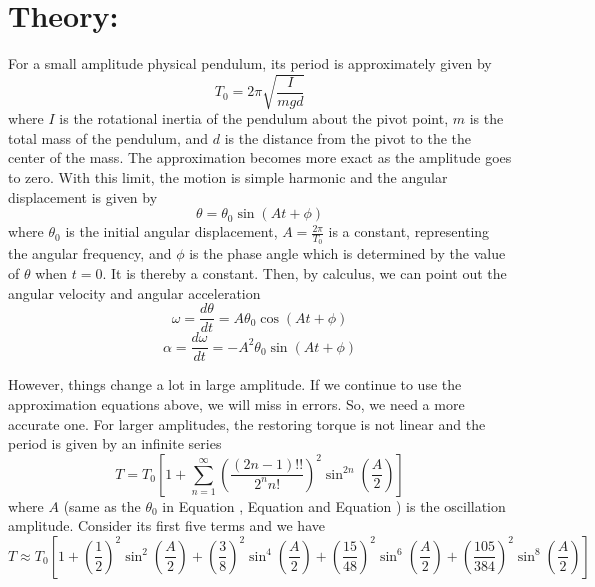 \section{Theory:}
For a small amplitude physical pendulum, its period is approximately given by
\begin{equation}\label{eq:1}
  T_0=2\pi\sqrt{\frac{I}{mgd}}
\end{equation}
where $I$ is the rotational inertia of the pendulum about the pivot point, $m$ is the total mass of the pendulum, and $d$ is the distance from the pivot to the the center of the mass. The approximation becomes more exact as the amplitude goes to zero. With this limit, the motion is simple harmonic and the angular displacement is given by
\begin{equation}\label{eq:2}
  \theta=\theta_0\sin(At+\phi)
\end{equation}
where $\theta_0$ is the initial angular displacement, $A=\frac{2\pi}{T_0}$ is a constant, representing the angular frequency, and $\phi$ is the phase angle which is determined by the value of $\theta$ when $t=0$. It is thereby a constant. Then, by calculus, we can point out the angular velocity and angular acceleration
\begin{equation}\label{eq:3}
  \omega=\frac{d\theta}{dt}=A\theta_0\cos(At+\phi)
\end{equation}
\begin{equation}\label{eq:4}
  \alpha=\frac{d\omega}{dt}=-A^2\theta_0\sin(At+\phi)
\end{equation}
\par
However, things change a lot in large amplitude. If we continue to use the approximation equations above, we will miss in errors. So, we need a more accurate one. For larger amplitudes, the restoring torque is not linear and the period is given by an infinite series
\begin{equation}\label{eq:5}
  T=T_0[1+\sum_{n = 1}^{\infty}(\frac{(2n-1)!!}{2^nn!})^2\sin^{2n}(\frac{A}{2})]
\end{equation}
where $A$ (same as the $\theta_0$ in Equation , Equation  and Equation ) is the oscillation amplitude. Consider its first five terms and we have
\begin{equation}\label{eq:6}
  T\approx{T_0[1+(\frac{1}{2})^2\sin^2({\frac{A}{2}})+({\frac{3}{8}})^2\sin^4({\frac{A}{2}})+({\frac{15}{48}})^2\sin^6({\frac{A}{2}})+({\frac{105}{384}})^2\sin^8({\frac{A}{2}})]}
\end{equation}

